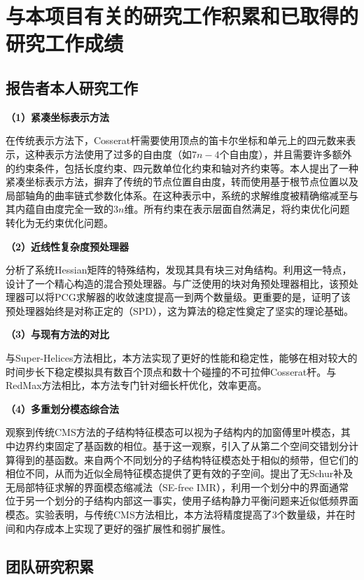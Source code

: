 
\section{与本项目有关的研究工作积累和已取得的研究工作成绩}

\subsection{报告者本人研究工作}

\textbf{（1）紧凑坐标表示方法}

在传统表示方法下，Cosserat杆需要使用顶点的笛卡尔坐标和单元上的四元数来表示，这种表示方法使用了过多的自由度（如$7n-4$个自由度），并且需要许多额外的约束条件，包括长度约束、四元数单位化约束和轴对齐约束等。本人提出了一种紧凑坐标表示方法，摒弃了传统的节点位置自由度，转而使用基于根节点位置以及局部轴角的曲率链式参数化体系。在这种表示中，系统的求解维度被精确缩减至与其内蕴自由度完全一致的$3n$维。所有约束在表示层面自然满足，将约束优化问题转化为无约束优化问题。

\textbf{（2）近线性复杂度预处理器}

分析了系统Hessian矩阵的特殊结构，发现其具有块三对角结构。利用这一特点，设计了一个精心构造的混合预处理器。与广泛使用的块对角预处理器相比，该预处理器可以将PCG求解器的收敛速度提高一到两个数量级。更重要的是，证明了该预处理器始终是对称正定的（SPD），这为算法的稳定性奠定了坚实的理论基础。

\textbf{（3）与现有方法的对比}

与Super-Helices方法相比，本方法实现了更好的性能和稳定性，能够在相对较大的时间步长下稳定模拟具有数百个顶点和数十个碰撞的不可拉伸Cosserat杆。与RedMax方法相比，本方法专门针对细长杆优化，效率更高。

\textbf{（4）多重划分模态综合法}

观察到传统CMS方法的子结构特征模态可以视为子结构内的加窗傅里叶模态，其中边界约束固定了基函数的相位。基于这一观察，引入了从第二个空间交错划分计算得到的基函数。来自两个不同划分的子结构特征模态处于相似的频带，但它们的相位不同，从而为近似全局特征模态提供了更有效的子空间。提出了无Schur补及无局部特征求解的界面模态缩减法（SE-free IMR），利用一个划分中的界面通常位于另一个划分的子结构内部这一事实，使用子结构静力平衡问题来近似低频界面模态。实验表明，与传统CMS方法相比，本方法将精度提高了3个数量级，并在时间和内存成本上实现了更好的强扩展性和弱扩展性。

\subsection{团队研究积累}


